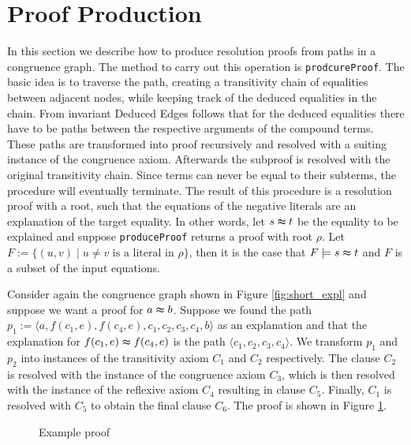 \section{Proof Production}
\label{sec:proofproduction}

In this section we describe how to produce resolution proofs from paths in a congruence graph.
The method to carry out this operation is \texttt{prodcureProof}.
The basic idea is to traverse the path, creating a transitivity chain of equalities between adjacent nodes, while keeping track of the deduced equalities in the chain.
From invariant Deduced Edges follows that for the deduced equalities there have to be paths between the respective arguments of the compound terms.
These paths are transformed into proof recursively and resolved with a suiting instance of the congruence axiom.
Afterwards the subproof is resolved with the original transitivity chain.
Since terms can never be equal to their subterms, the procedure will eventually terminate.
The result of this procedure is a resolution proof with a root, such that the equations of the negative literals are an explanation of the target equality.
In other words, let $s \thickapprox t$ be the equality to be explained and suppose \texttt{produceProof} returns a proof with root $\rho$.
Let $F := \{(u,v) \mid u \neq v \text{ is a literal in } \rho\}$, then it is the case that $F \models s \thickapprox t$ and $F$ is a subset of the input equations.




\begin{example}

Consider again the congruence graph shown in Figure \ref{fig:short_expl} and suppose we want a proof for $a \thickapprox b$.
Suppose we found the path $p_1 := \langle  a, f(c_1,e), f(c_4,e), c_1, c_2, c_3, c_4, b \rangle$ as an explanation and that the explanation for $f(c_1,e) \thickapprox f(c_4,e)$ is the path $\langle c_1, c_2, c_3, c_4 \rangle$.
We transform $p_1$ and $p_2$ into instances of the transitivity axiom $C_1$ and $C_2$ respectively. 
The clause $C_2$ is resolved with the instance of the congruence axiom $C_3$, which is then resolved with the instance of the reflexive axiom $C_4$ resulting in clause $C_5$.
Finally, $C_1$ is resolved with $C_5$ to obtain the final clause $C_6$.
The proof is shown in Figure \ref{fig:proofprod}.

\begin{figure}[!h]

\caption{Example proof}
\label{fig:proofprod}
\end{figure}

\end{example}

